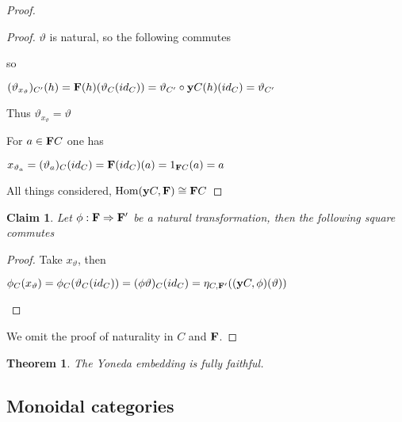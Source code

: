 \documentclass[a4paper]{article}
\theoremstyle{defin}
\theoremstyle{theorem}
\newtheorem{theorem}{Theorem}
\theoremstyle{claim}
\newtheorem{claim}{Claim}
\theoremstyle{prop}
\theoremstyle{lemma}
\theoremstyle{fact}
\theoremstyle{ex}
\theoremstyle{col}
\begin{document}
\begin{proof}
\begin{proof}
$\vartheta$ is natural, so the following commutes

\centerline{
}
so
\begin{center}
$(\vartheta_{x_{\vartheta}})_{C'}(h) = {\bf F}(h)(\vartheta_C(id_C)) = \vartheta_{C'} \circ {\bf y}C(h)(id_C) = \vartheta_{C'}$
\end{center}
Thus $\vartheta_{x_{\vartheta}} = \vartheta$


For $a \in {\bf F}C$ one has
\begin{center}
$x_{\vartheta_{a}} = (\vartheta_a)_C(id_C) = {\bf F}(id_C)(a) = 1_{{\bf F} C}(a) = a$
\end{center}

All things considered, $\operatorname{Hom}({\bf y}C, {\bf F}) \cong {\bf F}C$
\end{proof}

\begin{claim}
Let $\phi : {\bf F} \Rightarrow {\bf F}'$ be a natural transformation, then the following square commutes

\centerline{
}
\end{claim}

\begin{proof}
Take $x_{\vartheta}$, then

\begin{center}
$\phi_C(x_{\vartheta}) = \phi_C(\vartheta_C(id_C)) = (\phi \vartheta)_C(id_C) = \eta_{C, {\bf F}'}(({\bf y}C, \phi)(\vartheta))$
\end{center}
\end{proof}

We omit the proof of naturality in $C$ and ${\bf F}$.

\end{proof}

\begin{theorem}
The Yoneda embedding is fully faithful.
\end{theorem}

\subsection{Monoidal categories}
\end{document}
